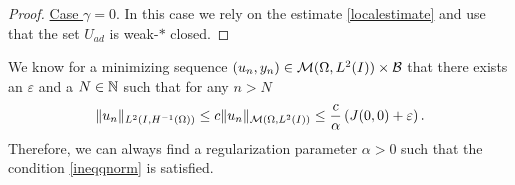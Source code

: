 \begin{proof}
\underline{Case $\gamma = 0$}. In this case we rely on the estimate \eqref{localestimate} and use that the set $U_{ad}$ is weak-$*$ closed.
\end{proof}
\begin{rmk}
 We know for a minimizing sequence $(u_n, y_n)\in \mathcal{M}(\Omega, L^{2}(I))\times \mathcal B$ that there exists an $\varepsilon$ and a $N \in \mathbb{N} $ such that for any $n > N$
 \[
\lVert u_n\rVert_{L^2(I,H^{-1}(\Omega))} \leq c\lVert u_n\rVert_{\mathcal{M}(\Omega, L^{2}(I))} \leq \frac{c}{\alpha}\left(J(0,0) + \varepsilon \right).
 \]
 Therefore, we can always find a regularization parameter $\alpha>0$ such that the condition \eqref{ineqqnorm} is satisfied.
\end{rmk}

